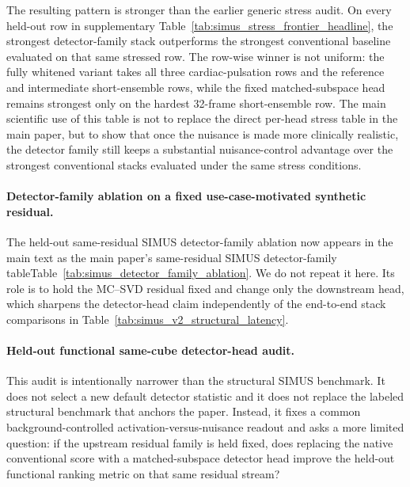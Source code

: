 The resulting pattern is stronger than the earlier generic stress audit. On every held-out row in supplementary Table~\ref{tab:simus_stress_frontier_headline}, the strongest detector-family stack outperforms the strongest conventional baseline evaluated on that same stressed row. The row-wise winner is not uniform: the fully whitened variant takes all three cardiac-pulsation rows and the reference and intermediate short-ensemble rows, while the fixed matched-subspace head remains strongest only on the hardest 32-frame short-ensemble row. The main scientific use of this table is not to replace the direct per-head stress table in the main paper, but to show that once the nuisance is made more clinically realistic, the detector family still keeps a substantial nuisance-control advantage over the strongest conventional stacks evaluated under the same stress conditions.

\paragraph{Detector-family ablation on a fixed use-case-motivated synthetic residual.}
The held-out same-residual SIMUS detector-family ablation now appears in the main text as \ifSUPPLEMENTONLY the main paper's same-residual SIMUS detector-family table\else Table~\ref{tab:simus_detector_family_ablation}\fi. We do not repeat it here. Its role is to hold the MC--SVD residual fixed and change only the downstream head, which sharpens the detector-head claim independently of the end-to-end stack comparisons in Table~\ref{tab:simus_v2_structural_latency}.

\paragraph{Held-out functional same-cube detector-head audit.}
This audit is intentionally narrower than the structural SIMUS benchmark. It does not select a new default detector statistic and it does not replace the labeled structural benchmark that anchors the paper. Instead, it fixes a common background-controlled activation-versus-nuisance readout and asks a more limited question: if the upstream residual family is held fixed, does replacing the native conventional score with a matched-subspace detector head improve the held-out functional ranking metric on that same residual stream?

